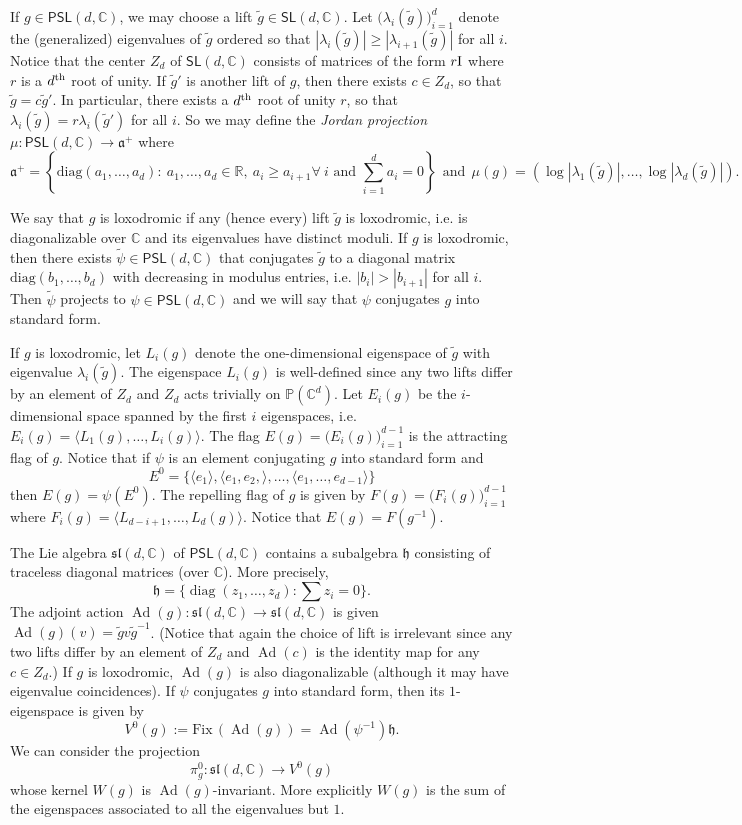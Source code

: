 \documentclass{amsart}
\theoremstyle{plain}
\theoremstyle{definition}
\theoremstyle{remark}
\newcommand{\R}{\mathbb R}
\newcommand{\Ad}{\operatorname{Ad}}
\newcommand{\PSL}{\mathsf{PSL}}
\newcommand{\SL}{\mathsf{SL}}
\newcommand{\h}{{\mathfrak h}}
\newcommand{\C}{\mathbb C}
\renewcommand{\sl}{\mathfrak{sl}}
\newcommand{\diag}{{\operatorname{diag}}}
\newcommand{\<}{\left <}
\renewcommand{\>}{\right >}
\renewcommand{\C}{\mathbb C}
\begin{document}
If $g\in\PSL(d,\C)$, we may choose a lift $\tilde g\in \SL(d,\mathbb C)$. Let $\big(\lambda_i(\tilde g)\big)_{i=1}^d$ denote the (generalized) eigenvalues of $\tilde g$ ordered
so that $|\lambda_i(\tilde g)|\ge |\lambda_{i+1}(\tilde g)|$ for all $i$. Notice that the center  $Z_d$ of $\mathsf{SL}(d,\mathbb C)$ consists of matrices of the form $r \rm{I}$ 
where $r$ is a $d^{\rm th}$ root of unity. 
If $\tilde g'$ is another lift of $g$, then there exists $c\in Z_d$, so that $\tilde g=c\tilde g'$. In particular,  there exists a  $d^{\rm th}$ root of unity $r$,  so that
$\lambda_i(\tilde g)=r\lambda_i(\tilde g')$  for all $i$. So we may define the {\em Jordan projection} $\mu:\PSL(d,\mathbb C)\to \mathfrak a^+$ where
$$\mathfrak a^+=\left\{\mathrm{diag}(a_1,\ldots,a_d):\ a_1, \ldots, a_d\in\R,\  a_i\ge a_{i+1}\forall\ i\text{ and } \sum_{i=1}^d a_i=0\right\}\ \ \text{and}\ \ \mu(g)=(\log|\lambda_1(\tilde g)|,
\ldots,\log |\lambda_d(\tilde g)|).$$


We say that $g$ is loxodromic if any (hence every) lift  $\tilde g$ is loxodromic, i.e. is 
diagonalizable over $\mathbb C$ and its eigenvalues have distinct moduli. 
If $g$ is loxodromic, then there exists $\tilde \psi\in\PSL(d,\C)$ that conjugates $\tilde g$ to a diagonal matrix $\mathrm{diag}(b_1,\ldots,b_d)$
with decreasing in modulus entries, i.e.
$|b_i|>|b_{i+1}|$ for all $i$. Then $\tilde\psi$ projects to $\psi\in\PSL(d,\C)$ and
we will say that $\psi$ conjugates $g$ into standard form.

If $g$ is loxodromic, let $L_i(g)$ denote the one-dimensional eigenspace of $\tilde g$ with eigenvalue $\lambda_i(\tilde g)$.
The eigenspace $L_i(g)$ is well-defined since any two lifts differ by an element of $Z_d$ and $Z_d$ acts trivially on $\mathbb P(\C^d)$.
Let $E_i(g)$ be the $i$-dimensional space spanned by the first $i$ eigenspaces, i.e. $E_i(g)=\langle L_1(g),\ldots, L_i(g)\rangle$.
The flag $E(g)=\big(E_i(g)\big)_{i=1}^{d-1}$ is the attracting flag of $g$. 
Notice that if $\psi$ is an element conjugating $g$
into standard form and 
$$E^0=\{ \langle e_1\rangle, \langle e_1, e_2, \rangle, \ldots,\langle e_1,\ldots,e_{d-1}\rangle\}$$
then $E(g)=\psi(E^0)$.
The repelling flag of $g$ is given by
$F(g)=\big(F_i(g)\big)_{i=1}^{d-1}$ where $F_i(g)=\langle L_{d-i+1},\ldots, L_d(g)\rangle$. Notice that $E(g)=F(g^{-1})$.

The Lie algebra $\sl(d,\C)$ of $\PSL(d,\C)$ contains a
subalgebra $\h$ consisting of traceless diagonal matrices (over $\C$). More precisely,
$$\h=\big\{\diag(z_1,\ldots,z_d):\sum z_i=0\big\}.$$ 
The adjoint action $\Ad(g):\sl(d,\C)\to\sl(d,\C)$ is given $\Ad(g)(v)=\tilde g v \tilde g^{-1}$.
(Notice that again the choice of lift is irrelevant since any two lifts differ by an element of $Z_d$ and $\Ad(c)$ is the identity map for any  $c\in Z_d$.)
If $g$ is loxodromic, $\Ad(g)$ is also diagonalizable (although it may have eigenvalue coincidences).
If $\psi$ conjugates $g$ into standard form, then its $1$-eigenspace is given by
$$V^0(g):=\mathrm{Fix}\,(\Ad(g))=\Ad(\psi^{-1})\h.$$
We can consider the projection 
$$\pi^0_g:\sl(d,\C)\to V^0(g)$$ 
whose kernel $W(g)$ is $\Ad(g)$-invariant. More explicitly $W(g)$ is  the sum of the eigenspaces associated to all the eigenvalues but $1$.
\end{document}
